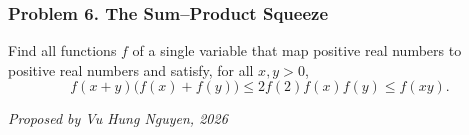 \subsubsection*{Problem 6. The Sum--Product Squeeze}

\begin{exercisebox}[medium]

Find all functions $f$ of a single variable that map
positive real numbers to positive real numbers and
satisfy, for all $x,y>0$,
\[
f(x+y)\bigl(f(x)+f(y)\bigr)
\le 2f(2)f(x)f(y)
\le f(xy).
\]

\begin{flushright}
\textit{Proposed by Vu Hung Nguyen, 2026}
\end{flushright}


\end{exercisebox}